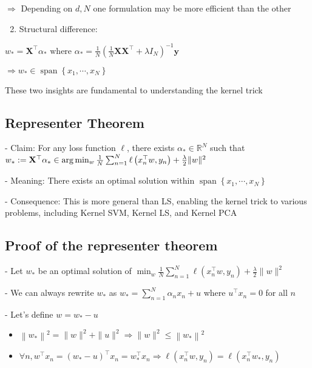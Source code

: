 $\Rightarrow$ Depending on $d, N$ one formulation may be more efficient than the other

\begin{enumerate}
  \setcounter{enumi}{1}
  \item Structural difference:
\end{enumerate}

$
w_{*}=\mathbf{X}^{\top} \alpha_{*} \text { where } \alpha_{*}=\frac{1}{N}\left(\frac{1}{N} \mathbf{X} \mathbf{X}^{\top}+\lambda I_{N}\right)^{-1} \mathbf{y}
$

$\Rightarrow w_{*} \in \operatorname{span}\left\{x_{1}, \cdots, x_{N}\right\}$

These two insights are fundamental to understanding the kernel trick

\subsection*{Representer Theorem}
- Claim: For any loss function $\ell$, there exists $\alpha_{*} \in \mathbb{R}^{N}$ such that
$
w_{*}:=\\\mathbf{X}^{\top} \alpha_{*} \in \arg \min _{w} \frac{1}{N} \sum_{n=1}^{N} \ell\left(x_{n}^{\top} w, y_{n}\right)+\frac{\lambda}{2}\|w\|^{2}
$

- Meaning: There exists an optimal solution within $\operatorname{span}\left\{x_{1}, \cdots, x_{N}\right\}$

- Consequence: This is more general than LS, enabling the kernel trick to various problems, including Kernel SVM, Kernel LS, and Kernel PCA

\subsection*{Proof of the representer theorem}
- Let $w_{*}$ be an optimal solution of $\min _{w} \frac{1}{N} \sum_{n=1}^{N} \ell\left(x_{n}^{\top} w, y_{n}\right)+\frac{\lambda}{2}\|w\|^{2}$

- We can always rewrite $w_{*}$ as $w_{*}=\sum_{n=1}^{N} \alpha_{n} x_{n}+u$ where $u^{\top} x_{n}=0$ for all $n$

- Let's define $w=w_{*}-u$

\begin{itemize}
  \item $\left\|w_{*}\right\|^{2}=\|w\|^{2}+\|u\|^{2}\Rightarrow \|w\|^{2} \leq\left\|w_{*}\right\|^{2}$

  \item $\forall n, w^{\top}x_{n}=\left(w_{*}-u\right)^{\top} x_{n}=w_{*}^{\top} x_{n}\Rightarrow\ell\left(x_{n}^{\top} w, y_{n}\right)=\ell\left(x_{n}^{\top} w_{*}, y_{n}\right)$

\end{itemize}

